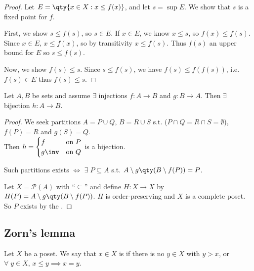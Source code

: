 \begin{proof}
    Let $E = \qty{x \in X : x \leq f(x)}$, and let $s = \sup E$.
    We show that $s$ is a fixed point for $f$.

    First, we show $s \leq f(s)$, so $s \in E$.
    If $x \in E$, we know $x \leq s$, so $f(x) \leq f(s)$.
    Since $x \in E$, $x \leq f(x)$, so by transitivity $x \leq f(s)$.
    Thus $f(s)$ an upper bound for $E$ so $s \leq f(s)$.

    Now, we show $f(s) \leq s$.
    Since $s \leq f(s)$, we have $f(s) \leq f(f(s))$, i.e. $f(s) \in E$ thus $f(s) \leq s$.
\end{proof}

\begin{corollary}
    Let $A, B$ be sets and assume $\exists$ injections $f \colon A \to B$ and $g \colon B \to A$.
    Then $\exists$ bijection $h : A \to B$.
\end{corollary}

\begin{proof}
    We seek partitions $A = P \cup Q$, $B = R \cup S$ s.t. ($P \cap Q = R \cap S = \emptyset$), $f(P) = R$ and $g(S) = Q$. \\
    Then $h = \begin{cases}
        f & \text{on } P \\
        g\inv & \text{on } Q
    \end{cases}$ is a bijection.

    Such partitions exists $\iff$ $\exists \; P \subseteq A$ s.t. $A \setminus g\qty(B \setminus f(P)) = P$.

    Let $X = \mathcal{P}(A)$ with ``$\subseteq$'' and define $H : X \to X$ by $H(P) = A \setminus g\qty(B \setminus f(P))$.
    $H$ is order-preserving and $X$ is a complete poset.
    So $P$ exists by the .
\end{proof}

\subsection{Zorn's lemma}
\begin{definition}[Maximal]
    Let $X$ be a poset.
    We say that $x \in X$ is  if there is no $y \in X$ with $y > x$, or $\forall \; y \in X$, $x \leq y \implies x = y$.
\end{definition}

